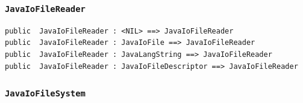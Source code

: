 \documentclass[\pformat,12pt]{article}
\begin{document}
\subsubsection{\texttt{JavaIoFileReader}}
\begin{small}
\begin{verbatim}
public  JavaIoFileReader : <NIL> ==> JavaIoFileReader
public  JavaIoFileReader : JavaIoFile ==> JavaIoFileReader
public  JavaIoFileReader : JavaLangString ==> JavaIoFileReader
public  JavaIoFileReader : JavaIoFileDescriptor ==> JavaIoFileReader
\end{verbatim}
\end{small}

\subsubsection{\texttt{JavaIoFileSystem}}
\end{document}
